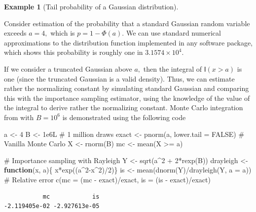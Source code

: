 \documentclass[
  11pt,
  letterpaper,
]{scrbook}
\newenvironment{Shaded}{\begin{snugshade}}{\end{snugshade}}
\newcommand{\AttributeTok}[1]{\textcolor[rgb]{0.40,0.45,0.13}{#1}}
\newcommand{\CommentTok}[1]{\textcolor[rgb]{0.37,0.37,0.37}{#1}}
\newcommand{\ConstantTok}[1]{\textcolor[rgb]{0.56,0.35,0.01}{#1}}
\newcommand{\ControlFlowTok}[1]{\textcolor[rgb]{0.00,0.23,0.31}{\textbf{#1}}}
\newcommand{\DecValTok}[1]{\textcolor[rgb]{0.68,0.00,0.00}{#1}}
\newcommand{\FloatTok}[1]{\textcolor[rgb]{0.68,0.00,0.00}{#1}}
\newcommand{\FunctionTok}[1]{\textcolor[rgb]{0.28,0.35,0.67}{#1}}
\newcommand{\NormalTok}[1]{\textcolor[rgb]{0.00,0.23,0.31}{#1}}
\newcommand{\OtherTok}[1]{\textcolor[rgb]{0.00,0.23,0.31}{#1}}
\newcommand{\SpecialCharTok}[1]{\textcolor[rgb]{0.37,0.37,0.37}{#1}}
\theoremstyle{definition}
\theoremstyle{plain}
\theoremstyle{plain}
\theoremstyle{definition}
\theoremstyle{definition}
\newtheorem{example}{Example}[chapter]
\theoremstyle{remark}
\begin{document}
\begin{example}[Tail probability of a Gaussian
distribution]\protect\hypertarget{exm-tail-probability}{}\label{exm-tail-probability}

Consider estimation of the probability that a standard Gaussian random
variable exceeds \(a=4,\) which is \(p=1-\Phi(a).\) We can use standard
numerical approximations to the distribution function implemented in any
software package, which shows this probability is roughly one in
\(\ensuremath{3.1574\times 10^{4}}.\)

If we consider a truncated Gaussian above \(a,\) then the integral of
\(\mathsf{I}(x>a)\) is one (since the truncated Gaussian is a valid
density). Thus, we can estimate rather the normalizing constant by
simulating standard Gaussian and comparing this with the importance
sampling estimator, using the knowledge of the value of the integral to
derive rather the normalizing constant. Monte Carlo integration from
with \(B=10^6\) is demonstrated using the following code

\begin{Shaded}
\begin{Highlighting}[]
\NormalTok{a }\OtherTok{\textless{}{-}} \DecValTok{4}
\NormalTok{B }\OtherTok{\textless{}{-}} \FloatTok{1e6}\NormalTok{L }\CommentTok{\# 1 million draws}
\NormalTok{exact }\OtherTok{\textless{}{-}} \FunctionTok{pnorm}\NormalTok{(a, }\AttributeTok{lower.tail =} \ConstantTok{FALSE}\NormalTok{)}
\CommentTok{\# Vanilla Monte Carlo}
\NormalTok{X }\OtherTok{\textless{}{-}} \FunctionTok{rnorm}\NormalTok{(B)}
\NormalTok{mc }\OtherTok{\textless{}{-}} \FunctionTok{mean}\NormalTok{(X }\SpecialCharTok{\textgreater{}=}\NormalTok{ a)}

\CommentTok{\# Importance sampling with Rayleigh}
\NormalTok{Y }\OtherTok{\textless{}{-}} \FunctionTok{sqrt}\NormalTok{(a}\SpecialCharTok{\^{}}\DecValTok{2} \SpecialCharTok{+} \DecValTok{2}\SpecialCharTok{*}\FunctionTok{rexp}\NormalTok{(B))}
\NormalTok{drayleigh }\OtherTok{\textless{}{-}} \ControlFlowTok{function}\NormalTok{(x, a)\{ x}\SpecialCharTok{*}\FunctionTok{exp}\NormalTok{((a}\SpecialCharTok{\^{}}\DecValTok{2}\SpecialCharTok{{-}}\NormalTok{x}\SpecialCharTok{\^{}}\DecValTok{2}\NormalTok{)}\SpecialCharTok{/}\DecValTok{2}\NormalTok{)\}}
\NormalTok{is }\OtherTok{\textless{}{-}} \FunctionTok{mean}\NormalTok{(}\FunctionTok{dnorm}\NormalTok{(Y)}\SpecialCharTok{/}\FunctionTok{drayleigh}\NormalTok{(Y, }\AttributeTok{a =}\NormalTok{ a))}
\CommentTok{\# Relative error}
\FunctionTok{c}\NormalTok{(}\AttributeTok{mc =}\NormalTok{ (mc }\SpecialCharTok{{-}}\NormalTok{ exact)}\SpecialCharTok{/}\NormalTok{exact, }\AttributeTok{is =}\NormalTok{ (is }\SpecialCharTok{{-}}\NormalTok{ exact)}\SpecialCharTok{/}\NormalTok{exact)}
\end{Highlighting}
\end{Shaded}

\begin{verbatim}
           mc            is 
-2.119405e-02 -2.927613e-05 
\end{verbatim}

\end{example}
\end{document}
